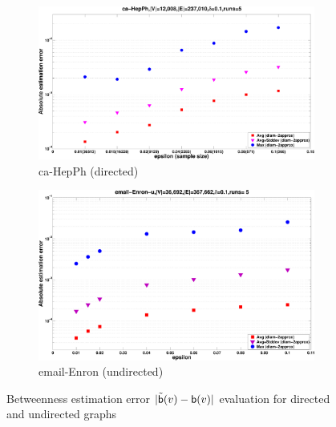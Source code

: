 \begin{figure}[htb]
  \begin{subfigure}[b]{0.49\textwidth}
    \includegraphics[width=\textwidth]{centrsampl/figures/eps/ca-HepPh-error}
    \caption{ca-HepPh (directed)}
    \label{fig:centrsamplHepPh:error}
  \end{subfigure}
  \fi
  \hfill
  \begin{subfigure}[b]{0.49\textwidth}
    \includegraphics[width=\textwidth]{centrsampl/figures/eps/email-Enron-error}
    \caption{email-Enron (undirected)}
    \label{fig:centrsamplemail:error}
  \end{subfigure}
  \caption{Betweenness estimation error $|\tilde{\mathsf{b}}(v)-\mathsf{b}(v)|$ evaluation for directed and undirected graphs} 
  \label{fig:centrsamplerror}
\end{figure}

